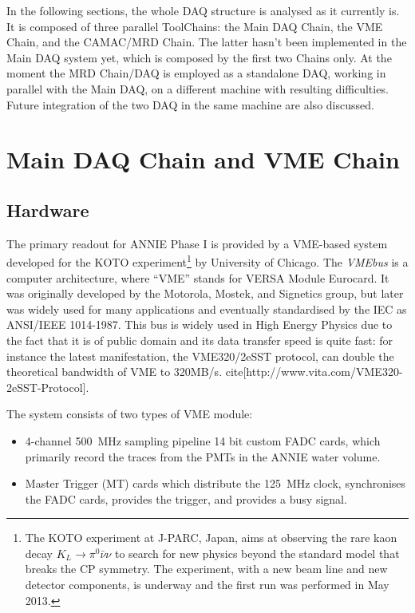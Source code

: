 In the following sections, the whole DAQ structure is analysed as it currently is.
It is composed of three parallel ToolChains: the Main DAQ Chain, the VME Chain, and %
the CAMAC/MRD Chain.
The latter hasn't been implemented in the Main DAQ system yet, which is composed by the %
first two Chains only.
At the moment the MRD Chain/DAQ is employed as a standalone DAQ, working in parallel %
with the Main DAQ, on a different machine with resulting difficulties.
Future integration of the two DAQ in the same machine are also discussed.

\section{Main DAQ Chain and VME Chain}
\label{sec:3.1}

\subsection{Hardware}

The primary readout for ANNIE Phase I is provided by a VME-based system developed for the KOTO %
experiment\footnote{The KOTO experiment at J-PARC, Japan, aims at observing the rare kaon decay %
  $K_L\rightarrow \pi^0 \bar{\nu} \nu$ to search for new physics beyond the standard model that %
  breaks the CP symmetry. The experiment, with a new beam line and new detector components, is %
  underway and the first run was performed in May 2013.} %
by University of Chicago.
The \emph{VMEbus} is a computer architecture, where ``VME'' stands for VERSA Module Eurocard.
It was originally developed by the Motorola, Mostek, and Signetics group, but later was widely %
used for many applications and eventually standardised by the IEC as ANSI/IEEE 1014-1987.
This bus is widely used in High Energy Physics due to the fact that it is of public domain and %
its data transfer speed is quite fast: for instance the latest manifestation, %
the VME320/2eSST protocol, can double the theoretical bandwidth of VME to 320MB/s.
cite[http://www.vita.com/VME320-2eSST-Protocol].

The system consists of two types of VME module:
\begin{itemize}
  \item 4-channel 500~MHz sampling pipeline 14 bit custom FADC cards, which primarily record %
    the traces from the PMTs in the ANNIE water volume.
  \item Master Trigger (MT) cards which distribute the 125~MHz clock, synchronises the FADC %
    cards, provides the trigger, and provides a busy signal.
\end{itemize}

